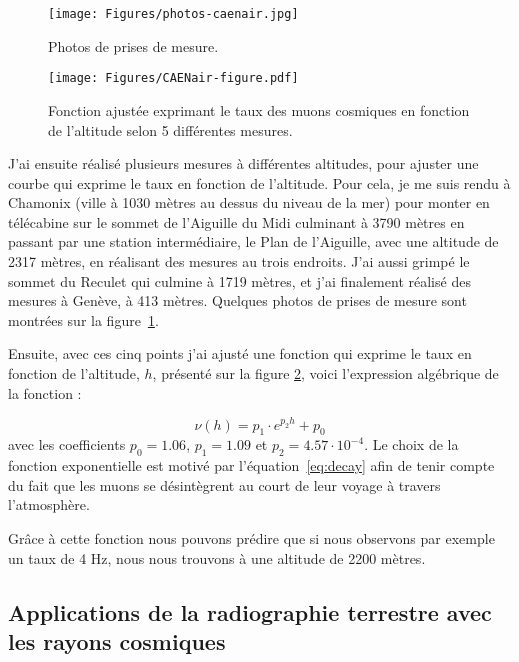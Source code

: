 \documentclass[a4paper, 12pt]{article}
\begin{document}
\begin{spacing}{1.5}
\begin{figure}[t]
\begin{center}
\texttt{[image: Figures/photos-caenair.jpg]}
\caption{\label{fig:photos-caenair} Photos de prises de mesure.}
\end{center}
\end{figure}
\begin{figure}[t]
\begin{center}
\texttt{[image: Figures/CAENair-figure.pdf]}
\caption{\label{fig:CAENair-figure} Fonction ajustée exprimant le taux des muons cosmiques en fonction de l'altitude selon 5 différentes mesures.}
\end{center}
\end{figure}

J'ai ensuite réalisé plusieurs mesures à différentes altitudes, pour ajuster une courbe qui exprime le taux en fonction de l'altitude. Pour cela, je me suis rendu à Chamonix (ville à 1030 mètres au dessus du niveau de la mer) pour monter en télécabine sur le sommet de l'Aiguille du Midi culminant à 3790 mètres en passant par une station intermédiaire, le Plan de l'Aiguille, avec une altitude de 2317 mètres, en réalisant des mesures au trois endroits. J'ai aussi grimpé le sommet du Reculet qui culmine à 1719 mètres, et j'ai finalement réalisé des mesures à Genève, à 413 mètres. Quelques photos de prises de mesure sont montrées sur la figure~\ref{fig:photos-caenair}.

Ensuite, avec ces cinq points j'ai ajusté une fonction qui exprime le taux en fonction de l'altitude, $h$, présenté sur la figure \ref{fig:CAENair-figure}, voici l'expression algébrique de la fonction :

\begin{equation}
\nu(h) = p_1\cdot e^{p_2  h} +  p_0
\end{equation}
avec les coefficients $p_0=1.06$, $p_1=1.09$ et $p_2=4.57\cdot 10^{-4}$. Le choix de la fonction exponentielle est motivé par l'équation~\ref{eq:decay} afin de tenir compte du fait que les muons se désintègrent au court de leur voyage à travers l'atmosphère.

Grâce à cette fonction nous pouvons prédire que si nous observons par exemple un taux de 4 Hz, nous nous trouvons à une altitude de 2200 mètres.

\subsection{Applications de la radiographie terrestre avec les rayons cosmiques}


\end{spacing}
\end{document}
